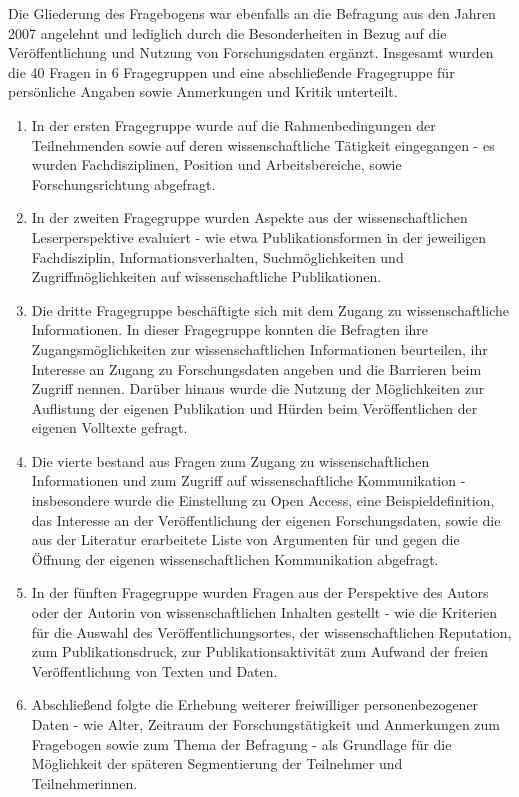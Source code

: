 Die Gliederung des Fragebogens war ebenfalls an die Befragung aus den Jahren 2007 angelehnt und lediglich durch die Besonderheiten in Bezug auf die Veröffentlichung und Nutzung von Forschungsdaten ergänzt. Insgesamt wurden die 40 Fragen in 6 Fragegruppen und eine abschließende Fragegruppe für persönliche Angaben sowie Anmerkungen und Kritik unterteilt.

\begin{enumerate}
\item In der ersten Fragegruppe wurde auf die Rahmenbedingungen der Teilnehmenden sowie auf deren wissenschaftliche Tätigkeit eingegangen - es wurden Fachdisziplinen, Position und Arbeitsbereiche, sowie Forschungsrichtung abgefragt.
\item In der zweiten Fragegruppe wurden Aspekte aus der wissenschaftlichen Leserperspektive evaluiert - wie etwa Publikationsformen in der jeweiligen Fachdisziplin, Informationsverhalten, Suchmöglichkeiten und Zugriffmöglichkeiten auf wissenschaftliche Publikationen.
\item Die dritte Fragegruppe beschäftigte sich mit dem Zugang zu wissenschaftliche Informationen. In dieser Fragegruppe konnten die Befragten ihre Zugangsmöglichkeiten zur wissenschaftlichen Informationen beurteilen, ihr Interesse an Zugang zu Forschungsdaten angeben und die Barrieren beim Zugriff nennen. Darüber hinaus wurde die Nutzung der Möglichkeiten zur Auflistung der eigenen Publikation und Hürden beim Veröffentlichen der eigenen Volltexte gefragt.
\item Die vierte bestand aus Fragen zum Zugang zu wissenschaftlichen Informationen und zum Zugriff auf wissenschaftliche Kommunikation - insbesondere wurde die Einstellung zu Open Access, eine Beispieldefinition, das Interesse an der Veröffentlichung der eigenen Forschungsdaten, sowie die aus der Literatur erarbeitete Liste von Argumenten für und gegen die Öffnung der eigenen wissenschaftlichen Kommunikation abgefragt.
\item In der fünften Fragegruppe wurden Fragen aus der Perspektive des Autors oder der Autorin von wissenschaftlichen Inhalten gestellt - wie die Kriterien für die Auswahl des Veröffentlichungsortes, der wissenschaftlichen Reputation, zum Publikationsdruck, zur Publikationsaktivität zum Aufwand der freien Veröffentlichung von Texten und Daten.
\item Abschließend folgte die Erhebung weiterer freiwilliger personenbezogener Daten - wie Alter, Zeitraum der Forschungstätigkeit und Anmerkungen zum Fragebogen sowie zum Thema der Befragung - als Grundlage für die Möglichkeit der späteren Segmentierung der Teilnehmer und Teilnehmerinnen.
\end{enumerate}


